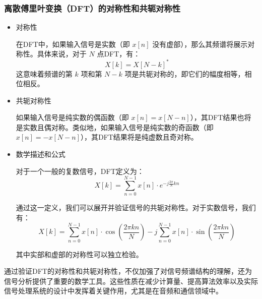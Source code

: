 \documentclass[a4paper,12pt]{article}
\begin{document}
\subsubsection{离散傅里叶变换（DFT）的对称性和共轭对称性}
\begin{itemize}
    \item 对称性

    在DFT中，如果输入信号是实数（即 \( x[n] \) 没有虚部），那么其频谱将展示对称性。具体来说，对于 \( N \) 点DFT，有：
\[ X[k] = X[N-k]^* \]
这意味着频谱的第 \( k \) 项和第 \( N-k \) 项是共轭对称的，即它们的幅度相等，相位相反。

    \item 共轭对称性

如果输入信号是纯实数的偶函数（即 \( x[n] = x[N-n] \)），其DFT结果也将是实数且偶对称。类似地，如果输入信号是纯实数的奇函数（即 \( x[n] = -x[N-n] \)），其DFT结果将是纯虚数且奇对称。

    \item 数学描述和公式
    
对于一个一般的复数信号，DFT定义为：
\begin{equation}
X[k] = \sum_{n=0}^{N-1} x[n] \cdot e^{-j\frac{2\pi}{N}kn}
\end{equation}

通过这一定义，我们可以展开并验证信号的共轭对称性。对于实数信号，我们有：
\begin{equation}
X[k] = \sum_{n=0}^{N-1} x[n] \cdot \cos\left(\frac{2\pi kn}{N}\right) - j\sum_{n=0}^{N-1} x[n] \cdot \sin\left(\frac{2\pi kn}{N}\right)
\end{equation}

其中实部和虚部的对称性可以独立检验。
    
\end{itemize}

通过验证DFT的对称性和共轭对称性，不仅加强了对信号频谱结构的理解，还为信号分析提供了重要的数学工具。这些性质在减少计算量、提高算法效率以及实际信号处理系统的设计中发挥着关键作用，尤其是在音频和通信领域中。
\end{document}
